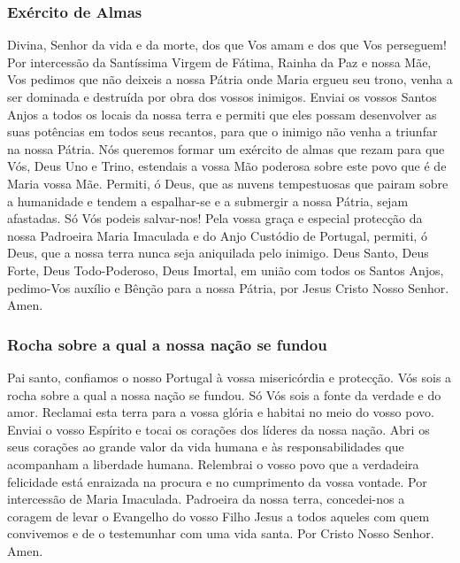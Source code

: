 \subsubsection{Exército de Almas}
 Divina, Senhor da vida e da morte, dos que Vos amam e dos que Vos perseguem! Por intercessão da Santíssima Virgem de Fátima, Rainha da Paz e nossa Mãe, Vos pedimos que não deixeis a nossa Pátria onde Maria ergueu seu trono, venha a ser dominada e destruída por obra dos vossos inimigos. Enviai os vossos Santos Anjos a todos os locais da nossa terra e permiti que eles possam desenvolver as suas potências em todos seus recantos, para que o inimigo não venha a triunfar na nossa Pátria. Nós queremos formar um exército de almas que rezam para que Vós, Deus Uno e Trino, estendais a vossa Mão poderosa sobre este povo que é de Maria vossa Mãe. Permiti, ó Deus, que as nuvens tempestuosas que pairam sobre a humanidade e tendem a espalhar-se e a submergir a nossa Pátria, sejam afastadas. Só Vós podeis salvar-nos! Pela vossa graça e especial protecção da nossa Padroeira Maria Imaculada e do Anjo Custódio de Portugal, permiti, ó Deus, que a nossa terra nunca seja aniquilada pelo inimigo. Deus Santo, Deus Forte, Deus Todo-Poderoso, Deus Imortal, em união com todos os Santos Anjos, pedimo-Vos auxílio e Bênção para a nossa Pátria, por Jesus Cristo Nosso Senhor. Amen.

\subsubsection{Rocha sobre a qual a nossa nação se fundou}
 Pai santo, confiamos o nosso Portugal à vossa misericórdia e protecção. Vós sois a rocha sobre a qual a nossa nação se fundou. Só Vós sois a fonte da verdade e do amor. Reclamai esta terra para a vossa glória e habitai no meio do vosso povo. Enviai o vosso Espírito e tocai os corações dos líderes da nossa nação. Abri os seus corações ao grande valor da vida humana e às responsabilidades que acompanham a liberdade humana. Relembrai o vosso povo que a verdadeira felicidade está enraizada na procura e no cumprimento da vossa vontade. Por intercessão de Maria Imaculada. Padroeira da nossa terra, concedei-nos a coragem de levar o Evangelho do vosso Filho Jesus a todos aqueles com quem convivemos e de o testemunhar com uma vida santa. Por Cristo Nosso Senhor. Amen.

